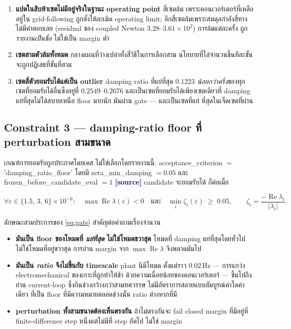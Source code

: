 \documentclass[12pt,a4paper]{article}
\theoremstyle{remark}
\newcommand{\code}[1]{{\ttfamily\small\hyphenchar\font=-1 #1}}
\newcommand{\sourcecode}{\textcolor{navy}{\textbf{[source]}}}
\begin{document}
\begin{enumerate}[leftmargin=1.9em,itemsep=3pt]
\item \textbf{แปดในสิบห้าเซตไม่มีอยู่จริงในฐานะ operating point} สี่เซตล้ม
      เพราะคอนเวอร์เตอร์ที่เหลืออยู่ใน grid-following ถูกสั่งให้ละเมิด
      operating limit; อีกสี่เซตล้มเพราะสมดุลกำลังสี่ทางไม่มีคำตอบเลย
      (residual ของ coupled Newton $3.28$--$3.61\times10^{2}$) การล้มแต่ละครั้ง
      ถูก\emph{รายงานเป็นชื่อ} ไม่ใช่เป็น margin ต่ำ
\item \textbf{เซตสามตัวล้มทั้งหมด} กลางแผนที่ว่างเปล่าทั้งสี่วิธีในการเลือกสาม
      นโยบายที่ไล่จำนวนขึ้นทีละขั้นจะถูกปฏิเสธที่ขั้นที่สาม
\item \textbf{เซตสี่ตัวยอมรับได้แต่เป็น outlier} damping ratio ที่แย่ที่สุด
      $0.1223$ \emph{น้อยกว่าครึ่ง}ของทุกเซตที่ยอมรับได้อื่นซึ่งอยู่ที่
      $0.2549$--$0.2676$ และเป็นเซตที่ยอมรับได้เพียงเซตเดียวที่ damping
      แย่ที่สุดไม่ได้สบายเหนือ floor มากนัก มันผ่าน gate --- และเป็นเซตที่แย่
      ที่สุดในเจ็ดเซตที่ผ่าน
\end{enumerate}

\subsection{Constraint 3 --- damping-ratio floor ที่ perturbation สามขนาด}

เกณฑ์การยอมรับถูกประกาศโดยเคส ไม่ใช่เลือกโดยรายงานนี้:
\code{acceptance\_criterion} $=$ \code{'damping\_ratio\_floor'} โดยมี
\code{zeta\_min\_damping} $= 0.05$ และ
\code{frozen\_before\_candidate\_eval} $= 1$ \sourcecode{} candidate จะยอมรับได้
ก็ต่อเมื่อ

\begin{equation}
\forall \varepsilon \in \{1.5,\,3,\,6\}\times10^{-6}:\quad
\max\operatorname{Re}\lambda(\varepsilon) < 0
\quad\text{และ}\quad
\min_i \zeta_i(\varepsilon) \;\ge\; 0.05,
\qquad
\zeta_i = \frac{-\operatorname{Re}\lambda_i}{|\lambda_i|}.
\label{eq:gate}
\end{equation}

ลักษณะสามประการของ \eqref{eq:gate} สำคัญต่อคำถามเรื่องจำนวน

\begin{itemize}[leftmargin=1.7em,itemsep=2pt]
\item \textbf{มันเป็น floor ของโหมดที่ \emph{แย่ที่สุด} ไม่ใช่โหมดขวาสุด}
      โหมดที่ damping แย่ที่สุดโดยทั่วไปไม่ใช่โหมดที่อยู่ขวาสุด การอ่าน margin
      จาก $\max\operatorname{Re}\lambda$ จึงพลาดมันไป
\item \textbf{มันเป็น \emph{ratio} จึงไม่ขึ้นกับ timescale} plant นีมีโหมด
      ตั้งแต่ราว $0.02$\,Hz --- การแกว่ง electromechanical ของเกาะที่ถูกทำให้ช้า
      ด้วยความเฉื่อยน้อยของคอนเวอร์เตอร์ --- ขึ้นไปถึงย่าน current-loop
      ซึ่งกินช่วงกว้างกว่าสามทศวรรษ ไม่มีอัตราการสลายแบบสัมบูรณ์ค่าใดค่าเดียว
      ที่เป็น floor ที่มีความหมายตลอดช่วงนั้น ratio ต่างหากที่มี
\item \textbf{perturbation ทั้งสามขนาดต้องเห็นตรงกัน} ถ้าไม่ตรงกันจะ fail closed
      margin ที่มีอยู่ที่ finite-difference step หนึ่งแต่ไม่มีที่ step ถัดไป
      ไม่ใช่ margin
\end{itemize}
\end{document}
